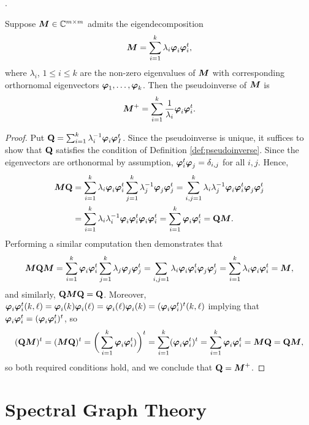 . 

\begin{lemma}
Suppose ${\vb*{M}}\in\mathbb{C}^{m\times m}$ admits the eigendecomposition 
\[{\vb*{M}}=\sum_{i=1}^k \lambda_i \vb*{\varphi}_i\vb*{\varphi}_i^t,\]
where $\lambda_i$, $1\leq i\leq k$ are the non-zero eigenvalues of ${\vb*{M}}$ with corresponding orthornomal eigenvectors $\vb*{\varphi}_1,\dots,\vb*{\varphi}_k$. Then the pseudoinverse of ${\vb*{M}}$ is 
\begin{equation}
    \label{eq:pseudoinverse}
    {\vb*{M}}^+=\sum_{i=1}^k \frac{1}{\lambda_i}\vb*{\varphi}_i\vb*{\varphi}_i^t.
\end{equation}
\end{lemma}
\begin{proof}
Put $\vb{Q}=\sum_{i=1}^k \lambda_i^{-1}\vb*{\varphi}_i\vb*{\varphi}_I^t$. Since the pseudoinverse is unique, it suffices to show that $\vb{Q}$ satisfies the condition of Definition \ref{def:pseudoinverse}.
Since the eigenvectors are orthonormal by assumption, $\vb*{\varphi}_i^t\vb*{\varphi}_j=\delta_{i,j}$ for all $i,j$. Hence,  
\begin{align*}
    {\vb*{M}}\vb{Q}&= \sum_{i=1}^k \lambda_i\vb*{\varphi}_i\vb*{\varphi}_i^t \sum_{j=1}^k \lambda_j^{-1}\vb*{\varphi}_j\vb*{\varphi}_j^t = \sum_{i,j=1}^k \lambda_i\lambda_j^{-1} \vb*{\varphi}_i\vb*{\varphi}_i^t \vb*{\varphi}_j\vb*{\varphi}_j^t \\
    &= \sum_{i=1}^k \lambda_i\lambda_i^{-1} \vb*{\varphi}_i\vb*{\varphi}_i^t\vb*{\varphi}_i\vb*{\varphi}_i^t 
    = \sum_{i=1}^k \vb*{\varphi}_i\vb*{\varphi}_i^t = \vb{Q}{\vb*{M}}.
\end{align*}
Performing a similar computation then demonstrates that 
\[{\vb*{M}}\vb{Q}{\vb*{M}} = \sum_{i=1}^k \vb*{\varphi}_i\vb*{\varphi}_i^t \sum_{j=1}^k \lambda_j\vb*{\varphi}_j\vb*{\varphi}_j^t=\sum_{i,j=1}\lambda_i \vb*{\varphi}_i\vb*{\varphi}_i^t\vb*{\varphi}_j\vb*{\varphi}_j^t=\sum_{i=1}^k \lambda_i \vb*{\varphi}_i\vb*{\varphi}_i^t ={\vb*{M}},\]
and similarly, $\vb{Q}{\vb*{M}}\vb{Q}=\vb{Q}$. Moreover, $\vb*{\varphi}_i\vb*{\varphi}_i^t (k,\ell)=\vb*{\varphi}_i(k)\vb*{\varphi}_i(\ell)=\vb*{\varphi}_i(\ell)\vb*{\varphi}_i(k)=(\vb*{\varphi}_i\vb*{\varphi}_i^t)^t (k,\ell)$ implying that $\vb*{\varphi}_i\vb*{\varphi}_i^t=(\vb*{\varphi}_i\vb*{\varphi}_i^t)^t$, so 
\[(\vb{Q}{\vb*{M}})^t=({\vb*{M}}\vb{Q})^t =\bigg(\sum_{i=1}^k \vb*{\varphi}_i\vb*{\varphi}_i^t )\bigg)^t = \sum_{i=1}^k (\vb*{\varphi}_i\vb*{\varphi}_i^t)^t = \sum_{i=1}^k \vb*{\varphi}_i\vb*{\varphi}_i^t={\vb*{M}}\vb{Q}=\vb{Q}{\vb*{M}},\]
so both required conditions hold, and we conclude that $\vb{Q}={\vb*{M}}^+$. 
\end{proof}



\section{Spectral Graph Theory}
\label{sec:background_spectral}


